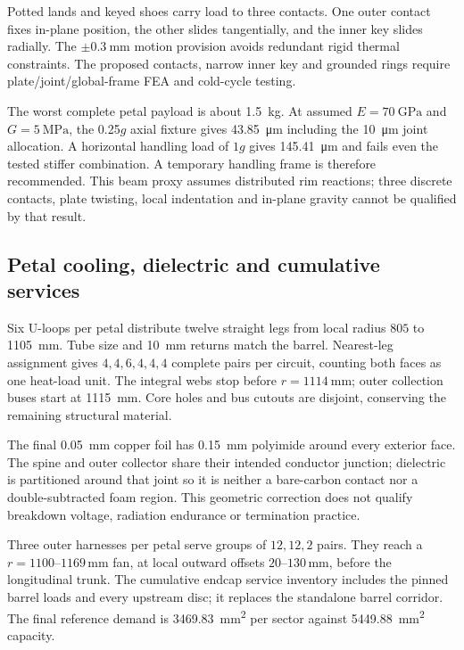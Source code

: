 Potted lands and keyed shoes carry load to three contacts. One outer contact
fixes in-plane position, the other slides tangentially, and the inner key slides
radially. The $\pm\qty{0.3}{\milli\metre}$ motion provision avoids redundant
rigid thermal constraints. The proposed contacts, narrow inner key and grounded
rings require plate/joint/global-frame FEA and cold-cycle testing.

The worst complete petal payload is about \qty{1.5}{\kilogram}. At assumed
$E=\qty{70}{\giga\pascal}$ and $G=\qty{5}{\mega\pascal}$, the
\num{0.25}$g$ axial fixture gives \qty{43.85}{\micro\metre} including the
\qty{10}{\micro\metre} joint allocation. A horizontal handling load of $1g$
gives \qty{145.41}{\micro\metre} and fails even the tested stiffer combination.
A temporary handling frame is therefore recommended. This beam proxy assumes
distributed rim reactions; three discrete contacts, plate twisting, local
indentation and in-plane gravity cannot be qualified by that result.

\subsection{Petal cooling, dielectric and cumulative services}
Six U-loops per petal distribute twelve straight legs from local radius
$805$ to \qty{1105}{\milli\metre}. Tube size and
\qty{10}{\milli\metre} returns match the barrel. Nearest-leg assignment gives
$4,4,6,4,4,4$ complete pairs per circuit, counting both faces as one heat-load
unit. The integral webs stop before $r=\qty{1114}{\milli\metre}$; outer
collection buses start at \qty{1115}{\milli\metre}. Core holes and bus cutouts
are disjoint, conserving the remaining structural material.

The final \qty{0.05}{\milli\metre} copper foil has
\qty{0.15}{\milli\metre} polyimide around every exterior face. The spine and
outer collector share their intended conductor junction; dielectric is
partitioned around that joint so it is neither a bare-carbon contact nor a
double-subtracted foam region. This geometric correction does not qualify
breakdown voltage, radiation endurance or termination practice.

Three outer harnesses per petal serve groups of $12,12,2$ pairs. They reach a
$r=1100$--$1169\,\unit{\milli\metre}$ fan, at local outward offsets
$20$--$130\,\unit{\milli\metre}$, before the longitudinal trunk. The cumulative
endcap service inventory includes the pinned barrel loads and every upstream
disc; it replaces the standalone barrel corridor. The final reference demand
is \qty{3469.83}{\milli\metre\squared} per sector against
\qty{5449.88}{\milli\metre\squared} capacity. 

